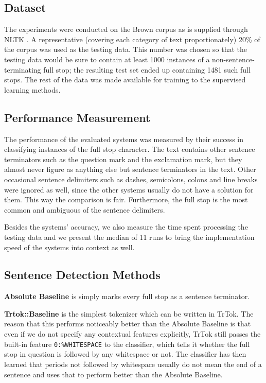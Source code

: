 \subsection{Dataset}

The experiments were conducted on the Brown corpus \cite{data-brown}
as is supplied through NLTK \cite{software-nltk}. A representative
(covering each category of text proportionately) 20\% of the corpus
was used as the testing data. This number was chosen so that the
testing data would be sure to contain at least 1000 instances of a
non-sentence-terminating full stop; the resulting test set ended up
containing 1481 such full stops. The rest of the data was made
available for training to the supervised learning methods.

\subsection{Performance Measurement}

The performance of the evaluated systems was measured by their success
in classifying instances of the full stop character. The text contains
other sentence terminators such as the question mark and the
exclamation mark, but they almost never figure as anything else but
sentence terminators in the text. Other occasional sentence delimiters
such as dashes, semicolons, colons and line breaks were ignored as
well, since the other systems usually do not have a solution for them.
This way the comparison is fair. Furthermore, the full stop is the
most common and ambiguous of the sentence delimiters.

Besides the systems' accuracy, we also measure the time spent
processing the testing data and we present the median of 11 runs to
bring the implementation speed of the systems into context as well.

\subsection{Sentence Detection Methods}

\textbf{Absolute Baseline} is simply marks every full stop as a
sentence terminator.

\textbf{Trtok::Baseline} is the simplest tokenizer which can be
written in TrTok. The reason that this performs noticeably better than
the Absolute Baseline is that even if we do not specify any contextual
features explicitly, TrTok still passes the built-in feature
\texttt{0:\%WHITESPACE} to the classifier, which tells it whether the
full stop in question is followed by any whitespace or not. The
classifier has then learned that periods not followed by whitespace
usually do not mean the end of a sentence and uses that to perform
better than the Absolute Baseline.

